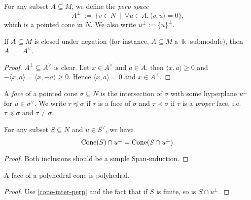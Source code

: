 \begin{definition}
  \label{perp}
  \uses{}
  \leanok
  For any subset \( A \subseteq M \), we define the \emph{perp space}
  \[
      A^{\perp}\ :=\ \{v \in N\ \mid\ \forall u \in A, \langle v, u \rangle = 0\},
  \]
  which is a pointed cone in \( N \). We also write \( u^{\perp} :=
  \{u\}^{\perp} \).
\end{definition}

\begin{lemma}
  \label{perp-closed-negation}
  \uses{}
  If \( A \subseteq M \) is closed under negation (for instance, \( A
  \subseteq M \) a \( \Bbbk \)-submodule), then \( A^{\perp} =
  A^{\vee} \).
\end{lemma}
\begin{proof}
  \uses{}
  \( A^{\perp} \subseteq A^{\vee} \) is clear. Let \( x \in A^{\vee}
  \) and \( a \in A \). then \( \langle x, a \rangle \geq 0 \) and \(
  -\langle x, a \rangle = \langle x, -a \rangle \geq 0 \). Hence \(
  \langle x, a \rangle = 0 \) and \( x \in A^{\perp} \).
\end{proof}


\begin{definition}
  \label{face}
  \leanok
  A \emph{face} of a pointed cone \( \sigma \subseteq N \) is the
  intersection of \( \sigma \) with some hyperplane \( u^{\perp} \)
  for \( u \in \sigma^{\vee} \). We write \( \tau \preceq \sigma \) if
  \( \tau \) is a face of \( \sigma \) and \( \tau \prec \sigma \) if
  \( \tau \) is a \emph{proper} face, i.e. \( \tau \preceq \sigma \)
  and \( \tau \neq \sigma \).
\end{definition}

\begin{proposition}
  \label{cone-inter-perp}
  For any subset \( S \subseteq N \) and \( u \in S^{\vee} \), we have
  \[
      \operatorname{Cone}(S) \cap u^{\perp} = \operatorname{Cone}(S \cap u^{\perp}).
  \]
\end{proposition}
\begin{proof}
    Both inclusions should be a simple Span-induction.
\end{proof}

\begin{lemma}
  \label{face-polyhedral}
  \leanok
  A face of a polyhedral cone is polyhedral.
\end{lemma}
\begin{proof}
  Use \ref{cone-inter-perp} and the fact that if \( S \) is finite,
  so is \( S \cap u^{\perp} \).
\end{proof}



